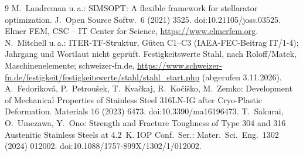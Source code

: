 \documentclass[10pt,a4paper]{article}
\begin{document}
\begin{thebibliography}{9}\small
{} M.~Landreman u.\,a.: SIMSOPT: A flexible framework for stellarator optimization. J.\ Open Source
  Softw.\ 6 (2021) 3525. doi:10.21105/joss.03525.
 Elmer FEM, CSC -- IT Center for Science, \url{https://www.elmerfem.org}.
 N.~Mitchell u.\,a.: ITER-TF-Struktur, Güten C1--C3 (IAEA-FEC-Beitrag IT/1-4); Jahrgang und
  Wortlaut nicht geprüft.
 Festigkeitswerte Stahl, nach Roloff/Matek, Maschinenelemente; schweizer-fn.de,
  \url{https://www.schweizer-fn.de/festigkeit/festigkeitswerte/stahl/stahl_start.php} (abgerufen 3.11.2026).
 A.~Fedoriková, P.~Petroušek, T.~Kvačkaj, R.~Kočiško, M.~Zemko: Development of Mechanical
  Properties of Stainless Steel 316LN-IG after Cryo-Plastic Deformation. Materials 16 (2023) 6473.
  doi:10.3390/ma16196473.
 T.~Sakurai, O.~Umezawa, Y.~Ono: Strength and Fracture Toughness of Type 304 and 316 Austenitic
  Stainless Steels at 4.2~K. IOP Conf.\ Ser.: Mater.\ Sci.\ Eng.\ 1302 (2024) 012002.
  doi:10.1088/1757-899X/1302/1/012002.
\end{thebibliography}
\end{document}
